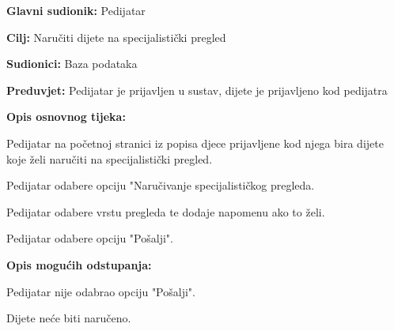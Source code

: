 					\noindent {}
					\begin{packed_item}
						
						\item \textbf{Glavni sudionik: }Pedijatar
						\item  \textbf{Cilj:} Naručiti dijete na specijalistički pregled
						\item  \textbf{Sudionici:} Baza podataka
						\item  \textbf{Preduvjet:} Pedijatar je prijavljen u sustav, dijete je prijavljeno kod pedijatra
						\item  \textbf{Opis osnovnog tijeka:}
						
						\item[] \begin{packed_enum}
							
							\item Pedijatar na početnoj stranici iz popisa djece prijavljene kod njega bira dijete koje želi naručiti na specijalistički pregled.
							\item Pedijatar odabere opciju "Naručivanje specijalističkog pregleda.
							\item Pedijatar odabere vrstu pregleda te dodaje napomenu ako to želi.
							\item Pedijatar odabere opciju "Pošalji".
						\end{packed_enum}
						
						\item  \textbf{Opis mogućih odstupanja:}
						
						\item[] \begin{packed_item}
							
							\item[4.a] Pedijatar nije odabrao opciju "Pošalji".
							\item[] \begin{packed_enum}
								
								\item Dijete neće biti naručeno.
							\end{packed_enum}
							
							
						\end{packed_item}
						
						
					\end{packed_item}
					
